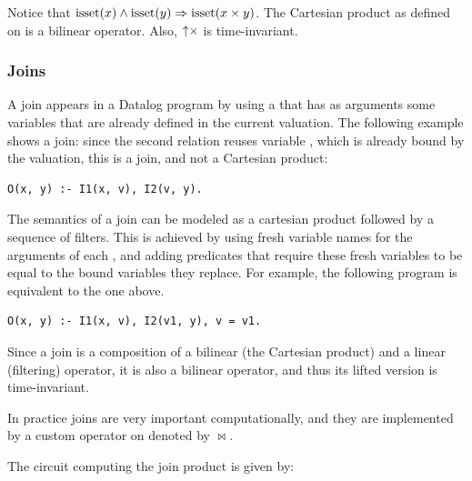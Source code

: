 Notice that $\mbox{isset}(x) \land \mbox{isset}(y) \Rightarrow \mbox{isset}(x \times y)$.
The Cartesian product as defined on \zrs is a bilinear operator.  Also,
${\uparrow}\times$ is time-invariant.

\subsubsection{Joins}\label{sec:join}

A join appears in a Datalog program by using a 
that has as arguments some variables that are already defined in the current valuation.
The following example shows a join: since the second relation reuses variable ,
which is already bound by the valuation, this is a join, and not a Cartesian product:

\begin{lstlisting}[language=ddlog]
O(x, y) :- I1(x, v), I2(v, y).
\end{lstlisting}

The semantics of a join can be modeled as a cartesian product followed by a sequence of filters.
This is achieved by using fresh variable names for the arguments of each 
, and adding predicates that require these fresh variables
to be equal to the bound variables they replace.
For example, the following program is equivalent to the one above.

\begin{lstlisting}[language=ddlog]
O(x, y) :- I1(x, v), I2(v1, y), v = v1.
\end{lstlisting}

Since a join is a composition of a bilinear (the Cartesian product) and a linear (filtering) operator, it is also a bilinear operator, and thus its lifted version is time-invariant.

In practice joins are very important computationally, and they are
implemented by a custom operator on \zrs denoted by $\bowtie$.

The circuit computing the join product is given by:


